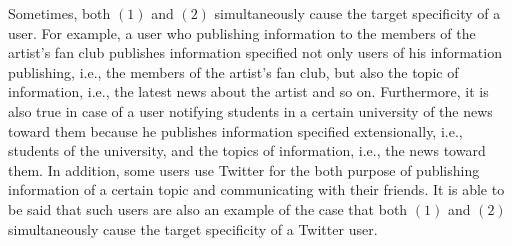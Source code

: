 Sometimes, both $(1)$ and $(2)$ simultaneously cause the target specificity of a
user.  For example, a user who publishing information to
the members of the artist's fan club publishes information specified not
only users of his information publishing, i.e., the members of the
artist's fan club, but also the topic of information, i.e., the latest news
about the artist and so on.  Furthermore, it is also true in case of a
user notifying students in a certain university of the news toward
them because he publishes information specified extensionally, i.e.,
students of the university, and the
topics of information, i.e., the news toward them.  In addition, some users use
Twitter for the both purpose of publishing information of a certain
topic and communicating with their friends.  It is able to be said that
such users are also an example of the case that both $(1)$ and $(2)$ simultaneously
cause the target specificity of a Twitter user.